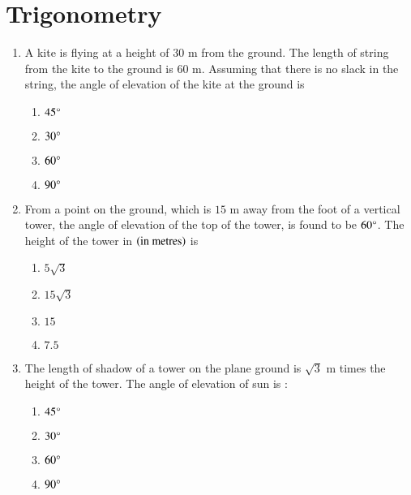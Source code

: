 \documentclass[journal,12pt,onecolumn]{IEEEtran}
\theoremstyle{remark}
\begin{document}
\section{Trigonometry}
\begin{enumerate}
\item A kite is flying at a height of $30 \text{ m}$ from the ground. The length of string from the kite to the ground is $60 \text{ m}$. Assuming that there is no slack in the string, the angle of elevation of the kite at the ground is\\
\begin{enumerate}
\item $45\degree$\\
\item $30\degree$\\
\item $60\degree$\\
\item $90\degree$\\
\end{enumerate}
\item From a point on the ground, which is $15\text{ m}$ away from the foot of a vertical tower, the angle of elevation of the top of the tower, is found to be $60\degree$. The height of the tower in $\left(\text{in metres}\right)$ is\\
\begin{enumerate}
\item $5\sqrt 3$\\
\item $15\sqrt 3$\\
\item $15$\\
\item $7.5$\\
\end{enumerate}
\item The length of shadow of a tower on the plane ground is $\sqrt 3 \text{ m}$ times the height of the tower. The angle of elevation of sun is :\\
\begin{enumerate}
\item $45\degree$\\
\item $30\degree$\\
\item $60\degree$\\
\item $90\degree$\\
\end{enumerate}

\end{enumerate}
\end{document}

